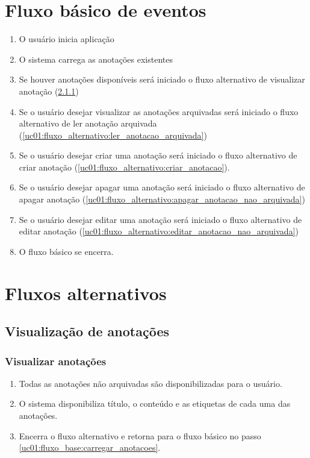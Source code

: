 \documentclass[
	12pt,				%
	oneside,			%
	a4paper,			%
	english,			%
	brazil,				%
	]{abntex2}
\begin{document}
\section{Fluxo básico de eventos}

\begin{enumerate}
    \item O usuário inicia aplicação
    \item O sistema carrega as anotações existentes \label{uc01:fluxo_base:carregar_anotacoes}
    \item Se houver anotações disponíveis será iniciado o fluxo alternativo de visualizar anotação (\ref{uc01:fluxo_alternativo:ler_anotacao_nao_arquivada})
    \item Se o usuário desejar visualizar as anotações arquivadas será iniciado o fluxo alternativo de ler anotação arquivada (\ref{uc01:fluxo_alternativo:ler_anotacao_arquivada})
    \item Se o usuário desejar criar uma anotação será iniciado o fluxo alternativo de criar anotação (\ref{uc01:fluxo_alternativo:criar_anotacao}).
    \item Se o usuário desejar apagar uma anotação será iniciado o fluxo alternativo de apagar anotação (\ref{uc01:fluxo_alternativo:apagar_anotacao_nao_arquivada})
    \item Se o usuário desejar editar uma anotação será iniciado o fluxo alternativo de editar anotação (\ref{uc01:fluxo_alternativo:editar_anotacao_nao_arquivada})
    \item O fluxo básico se encerra.
    
\end{enumerate}

\section{Fluxos alternativos}

\subsection{Visualização de anotações}
\subsubsection{Visualizar anotações} \label{uc01:fluxo_alternativo:ler_anotacao_nao_arquivada}
\begin{enumerate}   
    \item Todas as anotações não arquivadas são disponibilizadas para o usuário.
    \item O sistema disponibiliza título, o conteúdo e as etiquetas de cada uma das anotações.
    \item Encerra o fluxo alternativo e retorna para o fluxo básico no passo \ref{uc01:fluxo_base:carregar_anotacoes}.
\end{enumerate}
\end{document}
